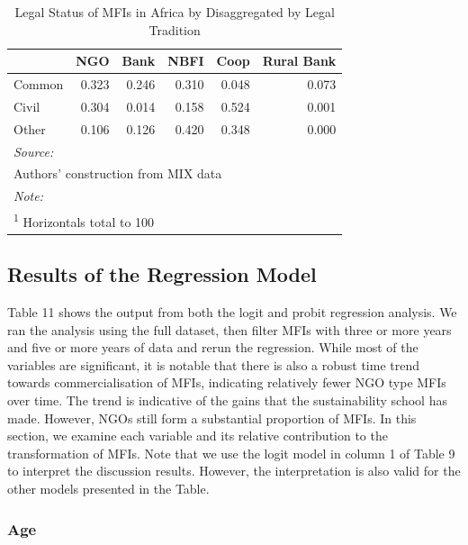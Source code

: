 \documentclass[a4paper, nobind]{templates/ociamthesis}
\begin{document}
\begin{table}

\caption{\label{tab:unnamed-chunk-34}Legal Status of MFIs in Africa by Disaggregated by Legal Tradition}
\centering
\begin{tabular}[t]{lrrrrr}
\toprule
  & NGO & Bank & NBFI & Coop & Rural Bank\\
\midrule
Common & 0.323 & 0.246 & 0.310 & 0.048 & 0.073\\
Civil & 0.304 & 0.014 & 0.158 & 0.524 & 0.001\\
Other & 0.106 & 0.126 & 0.420 & 0.348 & 0.000\\
\bottomrule
\multicolumn{6}{l}{\rule{0pt}{1em}\textit{Source: }}\\
\multicolumn{6}{l}{\rule{0pt}{1em}Authors' construction from MIX data}\\
\multicolumn{6}{l}{\rule{0pt}{1em}\textit{Note: }}\\
\multicolumn{6}{l}{\rule{0pt}{1em}\textsuperscript{1} Horizontals total to 100}\\
\end{tabular}
\end{table}

\newpage

\hypertarget{results-of-the-regression-model}{%
\subsection{Results of the Regression Model}\label{results-of-the-regression-model}}

Table 11 shows the output from both the logit and probit regression analysis. We ran the analysis using the full dataset, then filter MFIs with three or more years and five or more years of data and rerun the regression. While most of the variables are significant, it is notable that there is also a robust time trend towards commercialisation of MFIs, indicating relatively fewer NGO type MFIs over time. The trend is indicative of the gains that the sustainability school has made. However, NGOs still form a substantial proportion of MFIs. In this section, we examine each variable and its relative contribution to the transformation of MFIs. Note that we use the logit model in column 1 of Table 9 to interpret the discussion results. However, the interpretation is also valid for the other models presented in the Table.

\hypertarget{age}{%
\subsubsection{Age}\label{age}}
\end{document}
